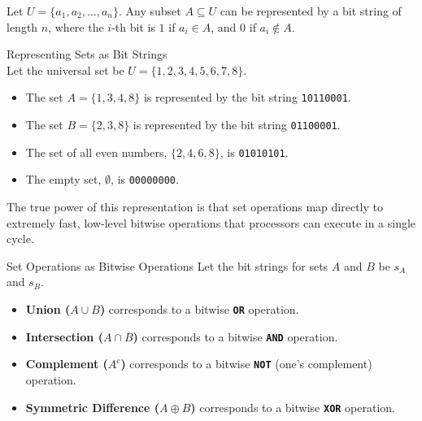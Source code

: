 Let $U = \{a_1, a_2, \dots, a_n\}$. Any subset $A \subseteq U$ can be represented by a bit string of length $n$, where the $i$-th bit is $1$ if $a_i \in A$, and $0$ if $a_i \notin A$.

\begin{example}{Representing Sets as Bit Strings}\\
    Let the universal set be $U = \{1, 2, 3, 4, 5, 6, 7, 8\}$.
    \begin{itemize}
        \item The set $A = \{1, 3, 4, 8\}$ is represented by the bit string \texttt{10110001}.
        \item The set $B = \{2, 3, 8\}$ is represented by the bit string \texttt{01100001}.
        \item The set of all even numbers, $\{2, 4, 6, 8\}$, is \texttt{01010101}.
        \item The empty set, $\emptyset$, is \texttt{00000000}.
    \end{itemize}
\end{example}

The true power of this representation is that set operations map directly to extremely fast, low-level bitwise operations that processors can execute in a single cycle.

\begin{custombox}{Set Operations as Bitwise Operations}
    Let the bit strings for sets $A$ and $B$ be $s_A$ and $s_B$.
    \begin{itemize}
        \item \textbf{Union ($A \cup B$)} corresponds to a bitwise \textbf{\texttt{OR}} operation.
        \item \textbf{Intersection ($A \cap B$)} corresponds to a bitwise \textbf{\texttt{AND}} operation.
        \item \textbf{Complement ($A^c$)} corresponds to a bitwise \textbf{\texttt{NOT}} (one's complement) operation.
        \item \textbf{Symmetric Difference ($A \oplus B$)} corresponds to a bitwise \textbf{\texttt{XOR}} operation.
    \end{itemize}
\end{custombox}

